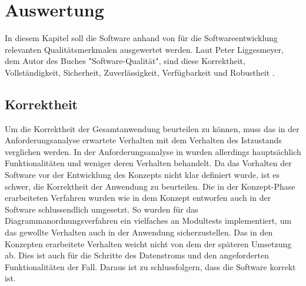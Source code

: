 \chapter{Auswertung}
\label{chap:auswertung}
In diesem Kapitel soll die Software anhand von für die Softwareentwicklung relevanten Qualitätsmerkmalen
ausgewertet werden. Laut Peter Liggesmeyer, dem Autor des Buches "Software-Qualität", sind diese
Korrektheit, Vollständigkeit, Sicherheit, Zuverlässigkeit, Verfügbarkeit und Robustheit \cite[S. 5]{SoftwareQualitaet}.

\section{Korrektheit}
\label{sec:korrektheit}
Um die Korrektheit der Gesamtanwendung beurteilen zu können, muss das in der Anforderungsanalyse erwartete
Verhalten mit dem Verhalten des Istzustands verglichen werden. In der Anforderungsanalyse
in  wurden allerdings hauptsächlich Funktionalitäten und weniger deren 
Verhalten behandelt. Da das Vorhalten der Software vor der Entwicklung des Konzepts nicht klar definiert wurde,
ist es schwer, die Korrektheit der Anwendung zu beurteilen. Die in der Konzept-Phase erarbeiteten Verfahren
wurden wie in dem Konzept entworfen auch in der Software schlussendlich umgesetzt. So wurden für
das Diagrammanordnungsverfahren ein vielfaches an Modultests implementiert, um das gewollte Verhalten auch in
der Anwendung sicherzustellen. Das in den Konzepten erarbeitete Verhalten weicht nicht von dem der späteren
Umsetzung ab. Dies ist auch für die Schritte des Datenstroms und den angeforderten Funktionalitäten der Fall.
Daraus ist zu schlussfolgern, dass die Software korrekt ist.


